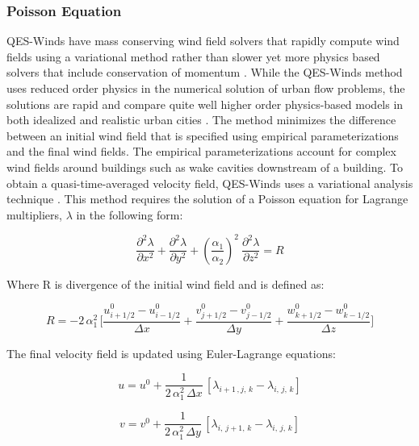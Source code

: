 \subsubsection{Poisson Equation}

QES-Winds have mass conserving wind field solvers that rapidly compute wind fields using a variational method rather than slower yet more physics based solvers that include conservation of momentum \cite{kim2014effects}. While the QES-Winds method uses reduced order physics in the numerical solution of urban flow problems, the solutions are rapid and compare quite well higher order physics-based models in both idealized \cite{hayati2017comprehensive} and realistic urban cities \cite{neophytou2011inter}. The method minimizes the difference between an initial wind field that is specified using empirical parameterizations \cite{singh2008evaluation} and the final wind fields. The empirical parameterizations account for complex wind fields around buildings such as wake cavities downstream of a building. To obtain a quasi-time-averaged velocity field, QES-Winds uses a variational analysis technique \cite{singh2008evaluation}. This method requires the solution of a Poisson equation for Lagrange multipliers, $\lambda$ in the following form:

\begin{equation} \label{poisson}
\frac{\partial^2\lambda}{\partial x^2} + \frac{\partial^2\lambda}{\partial y^2} + (\frac{\alpha_1}{\alpha_2})^2\:  \frac{\partial^2\lambda}{\partial z^2} = R
\end{equation}

Where R is divergence of the initial wind field and is defined as:

\begin{equation} \label{divergence}
 R = -2\,\alpha_1^2\,\Bigg[\frac{u_{i+1/2}^0-u_{i-1/2}^0}{\Delta x} + \frac{v_{j+1/2}^0-v_{j-1/2}^0}{\Delta y} + \frac{w_{k+1/2}^0-w_{k-1/2}^0}{\Delta z}\Bigg]
\end{equation}

The final velocity field is updated using Euler-Lagrange equations:

 \begin{equation} \label{eu-lag1}
 u = u^0 + \frac{1}{2\,\alpha_1^2\,\Delta x}\,[\lambda_{i+1\,,j,\,k}-\lambda_{i,\,j,\,k}]
\end{equation}

\begin{equation}
\label{eu-lag2}
 v = v^0 + \frac{1}{2\,\alpha_1^2\,\Delta y}\,[\lambda_{i,\,j+1,\,k}-\lambda_{i,\,j,\,k}]
\end{equation}

